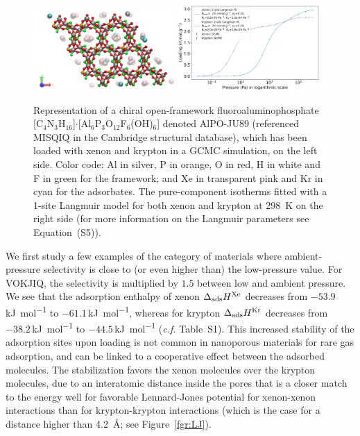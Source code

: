 \documentclass[main.tex]{subfiles}
\begin{document}
  \begin{figure}[t]
  \centering
    \includegraphics[width=0.48\textwidth]{figures/2-thermo/MISQIQ_clean.jpg}\hfill
    \includegraphics[width=0.48\textwidth]{figures/2-thermo/MISQIQ_clean_isotherm_xenon_krypton_298K.jpg}
    \caption{Representation of a chiral open-framework fluoroaluminophosphate [C$_4$N$_3$H$_{16}$]$\cdot$[Al$_6$P$_3$O$_{12}$F$_6$(OH)$_6$] denoted AlPO-JU89 (referenced MISQIQ in the Cambridge structural database), which has been loaded with xenon and krypton in a GCMC simulation, on the left side.\cite{MISQIQ} Color code: Al in silver, P in orange, O in red, H in white and F in green for the framework; and Xe in transparent pink and Kr in cyan for the adsorbates. The pure-component isotherms fitted with a 1-site Langmuir model for both xenon and krypton at \SI{298}{\kelvin} on the right side (for more information on the Langmuir parameters see Equation~(S5)).}
    \label{fgr:MISQIQ}
  \end{figure}
  
  We first study a few examples of the category of materials where ambient-pressure selectivity is close to (or even higher than) the low-pressure value. For VOKJIQ, the selectivity is multiplied by $1.5$ between low and ambient pressure. We see that the adsorption enthalpy of xenon $\Delta_{\text{ads}}H^{\text{Xe}}$ decreases from $-53.9$\,\si{\kilo\joule\per\mol} to $-61.1$\,\si{\kilo\joule\per\mol}, whereas for krypton $\Delta_{\text{ads}}H^{\text{Kr}}$ decreases from $-38.2$\,\si{\kilo\joule\per\mol} to $-44.5$\,\si{\kilo\joule\per\mol} (\emph{c.f.} Table~S1). This increased stability of the adsorption sites upon loading is not common in nanoporous materials for rare gas adsorption, and can be linked to a cooperative effect between the adsorbed molecules. The stabilization favors the xenon molecules over the krypton molecules, due to an interatomic distance inside the pores that is a closer match to the energy well for favorable Lennard-Jones potential for xenon-xenon interactions than for krypton-krypton interactions (which is the case for a distance higher than \SI{4.2}{\angstrom}; see Figure~\ref{fgr:LJ}).
\end{document}

